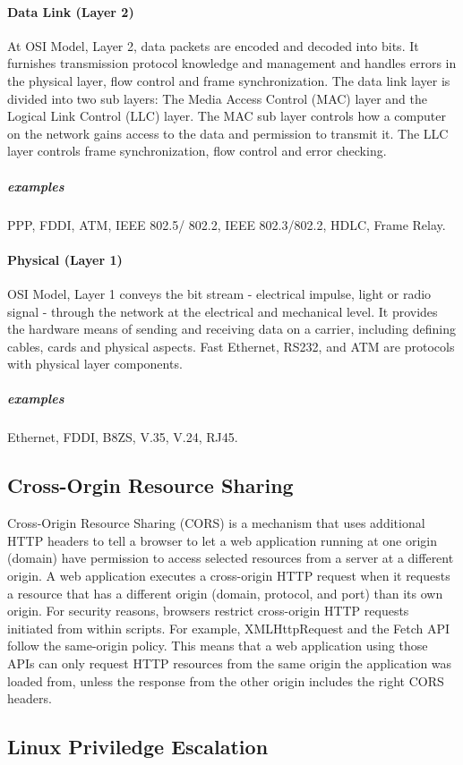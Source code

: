 \documentclass{article}[12pt]
\begin{document}
\paragraph{Data Link (Layer 2)}
At OSI Model, Layer 2, data packets are encoded and decoded into bits.
It furnishes transmission protocol knowledge and management and handles errors in the physical layer, flow control and frame synchronization.
The data link layer is divided into two sub layers: The Media Access Control (MAC) layer and the Logical Link Control (LLC) layer.
The MAC sub layer controls how a computer on the network gains access to the data and permission to transmit it.
The LLC layer controls frame synchronization, flow control and error checking.
\subparagraph{examples} PPP, FDDI, ATM, IEEE 802.5/ 802.2, IEEE 802.3/802.2, HDLC, Frame Relay.


\paragraph{Physical (Layer 1)}
OSI Model, Layer 1 conveys the bit stream - electrical impulse, light or radio signal - through the network at the electrical and mechanical level.
It provides the hardware means of sending and receiving data on a carrier, including defining cables, cards and physical aspects.
Fast Ethernet, RS232, and ATM are protocols with physical layer components.
\subparagraph{examples} Ethernet, FDDI, B8ZS, V.35, V.24, RJ45.

\subsection{Cross-Orgin Resource Sharing}
Cross-Origin Resource Sharing (CORS) is a mechanism that uses additional HTTP headers to tell a browser to let a web application running at one origin (domain) have permission to access selected resources from a server at a different origin.
A web application executes a cross-origin HTTP request when it requests a resource that has a different origin (domain, protocol, and port) than its own origin.
For security reasons, browsers restrict cross-origin HTTP requests initiated from within scripts.
For example, XMLHttpRequest and the Fetch API follow the same-origin policy.
This means that a web application using those APIs can only request HTTP resources from the same origin the application was loaded from, unless the response from the other origin includes the right CORS headers.
\subsection{Linux Priviledge Escalation}
\end{document}
